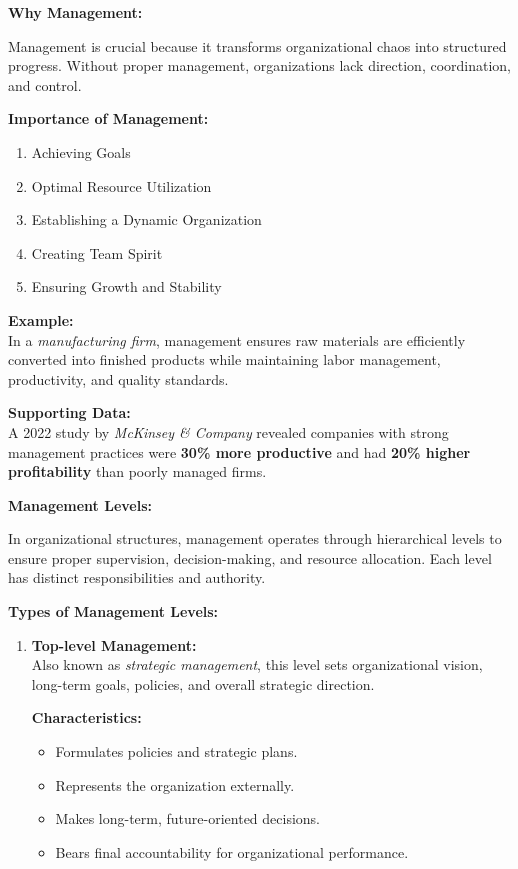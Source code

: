 \documentclass[10pt,a4paper]{book}
\begin{document}
\begin{multicols}{2}
\vspace{0.5cm}

\textbf{Why Management:}

Management is crucial because it transforms organizational chaos into structured progress. Without proper management, organizations lack direction, coordination, and control.

\textbf{Importance of Management:}
\begin{enumerate}
    \item Achieving Goals
    \item Optimal Resource Utilization
    \item Establishing a Dynamic Organization
    \item Creating Team Spirit
    \item Ensuring Growth and Stability
\end{enumerate}

\textbf{Example:}\\
In a \textit{manufacturing firm}, management ensures raw materials are efficiently converted into finished products while maintaining labor management, productivity, and quality standards.

\textbf{Supporting Data:}\\
A 2022 study by \textit{McKinsey \& Company} revealed companies with strong management practices were \textbf{30\% more productive} and had \textbf{20\% higher profitability} than poorly managed firms.


\textbf{Management Levels:}

In organizational structures, management operates through hierarchical levels to ensure proper supervision, decision-making, and resource allocation. Each level has distinct responsibilities and authority.

\textbf{Types of Management Levels:}
\begin{enumerate}
    \item \textbf{Top-level Management:}\\
    Also known as \textit{strategic management}, this level sets organizational vision, long-term goals, policies, and overall strategic direction.
    
    \textbf{Characteristics:}
    \begin{itemize}
        \item Formulates policies and strategic plans.
        \item Represents the organization externally.
        \item Makes long-term, future-oriented decisions.
        \item Bears final accountability for organizational performance.
    \end{itemize}


\end{enumerate}
\end{multicols}
\end{document}
